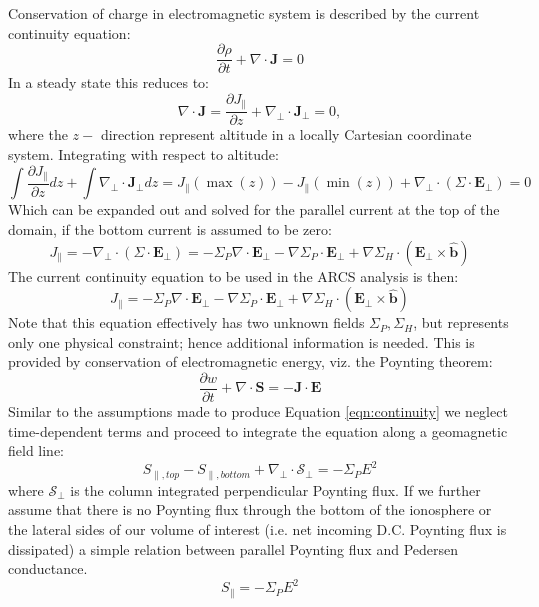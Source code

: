 \documentclass[11pt,letterpaper]{article}
\begin{document}
Conservation of charge in electromagnetic system is described by the current continuity equation:
\begin{equation}
  \frac{\partial \rho}{\partial t} + \nabla \cdot \mathbf{J} = 0
\end{equation}
In a steady state this reduces to:
\begin{equation}
\nabla \cdot \mathbf{J} = \frac{\partial J_\parallel}{\partial z} +  \nabla_\perp \cdot \mathbf{J}_\perp = 0,
\end{equation}
where the $z-$ direction represent altitude in a locally Cartesian coordinate system.  Integrating with respect to altitude:
\begin{equation}
\int \frac{\partial J_\parallel}{\partial z} dz +  \int \nabla_\perp \cdot \mathbf{J}_\perp dz = J_\parallel(\max(z)) - J_\parallel(\min(z)) + \nabla_\perp \cdot \left(  \Sigma \cdot \mathbf{E}_\perp \right) = 0
\end{equation}
Which can be expanded out and solved for the parallel current at the top of the domain, if the bottom current is assumed to be zero:
\begin{equation}
J_\parallel = - \nabla_\perp \cdot \left(  \Sigma \cdot \mathbf{E}_\perp \right) =  - \Sigma_P \nabla \cdot \mathbf{E}_\perp - \nabla \Sigma_P \cdot \mathbf{E}_\perp + \nabla \Sigma_H \cdot \left( \mathbf{E}_\perp \times \hat{\mathbf{b}} \right)
\end{equation}
The current continuity equation to be used in the ARCS analysis is then:
\begin{equation}
\boxed{
J_\parallel = -\Sigma_P \nabla \cdot \mathbf{E}_\perp - \nabla \Sigma_P \cdot \mathbf{E}_\perp + \nabla \Sigma_H \cdot \left( \mathbf{E}_\perp \times \hat{\mathbf{b}} \right)
} \label{eqn:continuity}
\end{equation}
Note that this equation effectively has two unknown fields $\Sigma_P,\Sigma_H$, but represents only one physical constraint; hence additional information is needed.  This is provided by conservation of electromagnetic energy, viz. the Poynting theorem:
\begin{equation}
\frac{\partial w}{\partial t} + \nabla \cdot \mathbf{S} = - \mathbf{J} \cdot \mathbf{E}
\end{equation}
Similar to the assumptions made to produce Equation \ref{eqn:continuity} we neglect time-dependent terms and proceed to integrate the equation along a geomagnetic field line:
\begin{equation}
S_{\parallel,top} - S_{\parallel,bottom} + \nabla_\perp \cdot \mathbf{\mathcal{S}}_\perp = - \Sigma_P E^2
\end{equation}
where $\mathbf{\mathcal{S}}_\perp$ is the column integrated perpendicular Poynting flux.  If we further assume that there is no Poynting flux through the bottom of the ionosphere or the lateral sides of our volume of interest (i.e. net incoming D.C. Poynting flux is dissipated) a simple relation between parallel Poynting flux and Pedersen conductance.  
\begin{equation}
\boxed{
S_{\parallel}  = - \Sigma_P E^2
} \label{eqn:poynting}
\end{equation}
\end{document}
